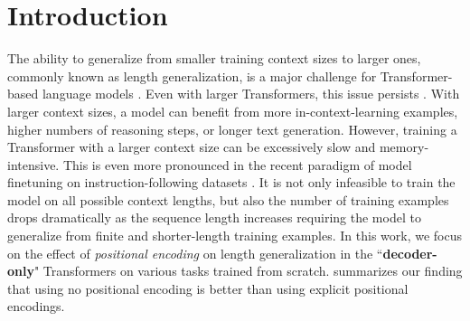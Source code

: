 \documentclass{article}
\begin{document}
\section{Introduction}
The ability to generalize from smaller training context sizes to larger ones, commonly known as length generalization, is a major challenge for Transformer-based language models \citep{Vaswani2017:Transformer, Deletang2023:Chomskey,Zhang2023:LEGO}.
Even with larger Transformers, this issue persists \citep{Brown2020:GPT3, Furrer2020:CompGenSM}.
With larger context sizes, a model can benefit from more in-context-learning examples, higher numbers of reasoning steps, or longer text generation.
However, training a Transformer with a larger context size can be excessively slow and memory-intensive.
This is even more pronounced in the recent paradigm of model finetuning on instruction-following datasets \citep{Wei2022:SFT,Chung2022:ScalingSFT,Ouyang2022:InstructGPT}.
It is not only infeasible to train the model on all possible context lengths, but also the number of training examples drops dramatically as the sequence length increases
requiring the model to generalize from finite and shorter-length training examples.
In this work, we focus on the effect of \emph{positional encoding} on length generalization in the ``\textbf{decoder-only}" Transformers on various tasks trained from scratch.
 summarizes our finding that using no positional encoding is better than using explicit positional encodings.
\end{document}
